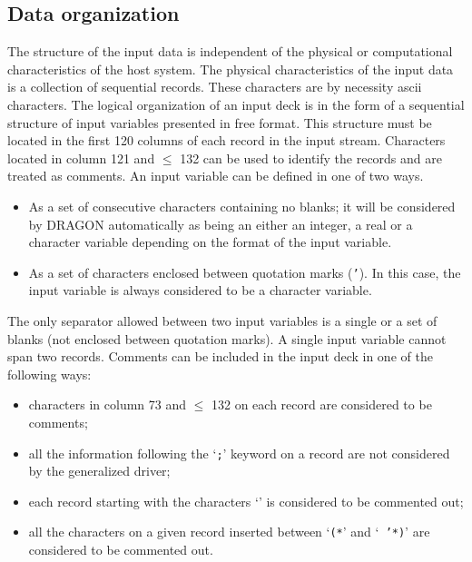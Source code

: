 \subsection{Data organization}\label{sect:DataOrg}

The structure of the input data is independent of the physical or computational
characteristics of the host system. The physical characteristics of the input
data is a collection of sequential records. These characters are by necessity
{\sc ascii} characters. The logical organization of an input deck is in the form
of a sequential structure of input variables presented in free format. This
structure must be located in the first 120 columns of each record in the input
stream. Characters located in column 121 and $\le$ 132 can be used to identify the
records and are treated as comments. An input variable can be defined in one of
two ways.

\begin{itemize}

\item As a set of consecutive characters containing no blanks; it will be
considered by DRAGON automatically as being an either an integer, a real or a
character variable depending on the format of the input variable.

\item As a set of characters enclosed between quotation marks ({\tt '}). In
this case, the input variable is always considered to be a character variable. 

\end{itemize}


The only separator allowed between two input variables is a single or a set of
blanks (not enclosed between quotation marks). A single input variable cannot
span two records. Comments can be included in the input deck in one of the
following ways:


\begin{itemize}

\item  characters in column 73 and $\le$ 132 on each record are considered to be
comments;

\item  all the information following the `{\tt ;}' keyword on a record are not
considered by the generalized driver;

\item  each record starting with the characters `{\tt *}' is considered to be
commented out;

\item  all the characters on a given record inserted between `{\tt (*}' and `{\tt
'*)}' are considered to be commented out.

\end{itemize}


